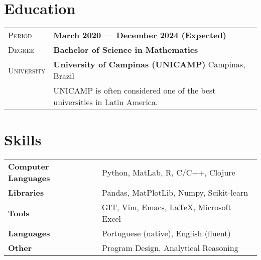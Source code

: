 \documentclass[a4paper, oneside, final]{scrartcl} %
\newcommand{\gray}{\rowcolor[gray]{.90}} %
\begin{document}
\begin{center}

\section{Education}

\begin{tabularx}{0.97\linewidth}{>{\raggedleft\scshape}p{2cm}X}
\gray Period & \textbf{March 2020 --- December 2024 (Expected)}\\
\gray Degree & \textbf{Bachelor of Science in Mathematics}\\
\gray University & \textbf{University of Campinas (UNICAMP)} \hfill Campinas, Brazil\\
    & UNICAMP is often considered one of the best universities in Latin America.
\end{tabularx}

\vspace{10pt} %



\section{Skills}

\begin{tabular}{ @{} >{\bfseries}l @{\hspace{6ex}} l }
Computer Languages & Python, MatLab, R, C/C++, Clojure \\
Libraries & Pandas, MatPlotLib, Numpy, Scikit-learn \\
Tools & GIT, Vim, Emacs, \LaTeX, Microsoft Excel \\
Languages & Portuguese (native), English (fluent) \\
Other & Program Design, Analytical Reasoning
\end{tabular}


\end{center}
\end{document}
